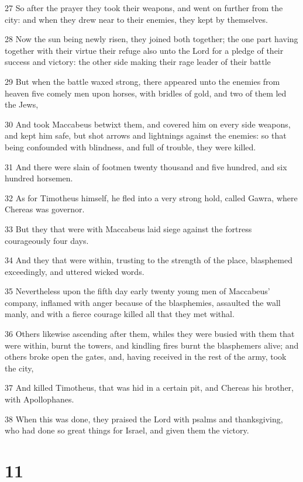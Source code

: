 \par 27 So after the prayer they took their weapons, and went on further from the city: and when they drew near to their enemies, they kept by themselves.
\par 28 Now the sun being newly risen, they joined both together; the one part having together with their virtue their refuge also unto the Lord for a pledge of their success and victory: the other side making their rage leader of their battle
\par 29 But when the battle waxed strong, there appeared unto the enemies from heaven five comely men upon horses, with bridles of gold, and two of them led the Jews,
\par 30 And took Maccabeus betwixt them, and covered him on every side weapons, and kept him safe, but shot arrows and lightnings against the enemies: so that being confounded with blindness, and full of trouble, they were killed.
\par 31 And there were slain of footmen twenty thousand and five hundred, and six hundred horsemen.
\par 32 As for Timotheus himself, he fled into a very strong hold, called Gawra, where Chereas was governor.
\par 33 But they that were with Maccabeus laid siege against the fortress courageously four days.
\par 34 And they that were within, trusting to the strength of the place, blasphemed exceedingly, and uttered wicked words.
\par 35 Nevertheless upon the fifth day early twenty young men of Maccabeus' company, inflamed with anger because of the blasphemies, assaulted the wall manly, and with a fierce courage killed all that they met withal.
\par 36 Others likewise ascending after them, whiles they were busied with them that were within, burnt the towers, and kindling fires burnt the blasphemers alive; and others broke open the gates, and, having received in the rest of the army, took the city,
\par 37 And killed Timotheus, that was hid in a certain pit, and Chereas his brother, with Apollophanes.
\par 38 When this was done, they praised the Lord with psalms and thanksgiving, who had done so great things for Israel, and given them the victory.

\chapter{11}

